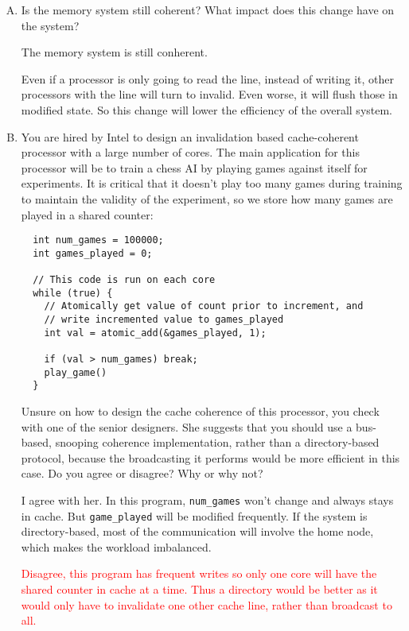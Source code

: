 \documentclass[11pt]{article}
\newenvironment{choice}{\begin{enumerate}[A.]}{\end{enumerate}}
\newenvironment{answer}{\begin{minipage}[c][1.5in]{\textwidth}}{\end{minipage}}
\begin{document}
\begin{choice}

\item
  Is the memory system still coherent? What impact does this change have on the system?

\begin{answer}
The memory system is still conherent. 

Even if a processor is only going to read the line, instead of writing it, other processors with the 
line will turn to invalid. Even worse, it will flush those in modified state. 
So this change will lower the efficiency of the overall system. 

\end{answer}

\newpage
\item 
  You are hired by Intel to design an invalidation based cache-coherent processor with a large number of cores.
The 
  main application for this processor will be to train a chess AI by playing games against itself for experiments. It is critical that it
  doesn't play too many games during training to maintain the validity of the experiment, so we store how many
  games are played in a shared counter:
  \begin{lstlisting}
  int num_games = 100000;
  int games_played = 0;

  // This code is run on each core
  while (true) {
    // Atomically get value of count prior to increment, and
    // write incremented value to games_played
    int val = atomic_add(&games_played, 1);   

    if (val > num_games) break;
    play_game()
  }
  \end{lstlisting}

  Unsure on how to design the cache coherence of this processor, you check with one of the senior designers. She suggests that you 
  should use a bus-based, snooping coherence implementation, rather than a directory-based protocol, because 
 the broadcasting it performs would be more
  efficient in this case. Do you agree or disagree? Why or why not?

\begin{answer}
  I agree with her. In this program, \lstinline{num_games} won't change and always stays in cache. 
  But \lstinline{game_played} will be modified frequently. If the system is directory-based, 
  most of the communication will involve the home node, which makes the workload imbalanced. 

  \textcolor{red}{
    Disagree, this program has frequent writes so only one core will have the shared counter 
    in cache at a time. Thus a directory would be better as it would only have to invalidate 
    one other cache line, rather than broadcast to all.
  }


\end{answer}
\end{choice}
\end{document}
